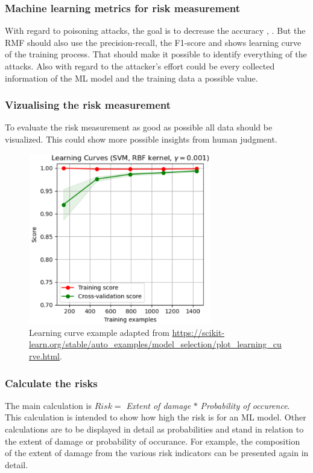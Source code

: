 \subsubsection*{Machine learning metrics for risk measurement}

With regard to poisoning attacks, the goal is to decrease the accuracy \cite{DBLP:conf/icml/BiggioNL12}, \cite{DBLP:journals/corr/abs-1708-06733}. But the RMF should also use the precision-recall, the F1-score and shows learning curve of the training process. That should make it possible to identify everything of the attacks. Also with regard to the attacker's effort could be every collected information of the ML model and the training data a possible value.

\subsubsection*{Vizualising the risk measurement}

To evaluate the risk measurement as good as possible all data should be visualized. This could show more possible insights from human judgment.

\begin{figure}[ht!]
  \centering
  \includegraphics[width=8cm]{pictures/learning_curve_example.png}
  \caption{Learning curve example adapted from \url{https://scikit-learn.org/stable/auto_examples/model_selection/plot_learning_curve.html}.}
  \label{fig:learning_curve_example}
\end{figure}

\subsubsection*{Calculate the risks}

The main calculation is $Risk = $ \textit{Extent of damage} $*$ \textit{Probability of occurence}. This calculation is intended to show how high the risk is for an ML model. Other calculations are to be displayed in detail as probabilities and stand in relation to the extent of damage or probability of occurance. For example, the composition of the extent of damage from the various risk indicators can be presented again in detail.

